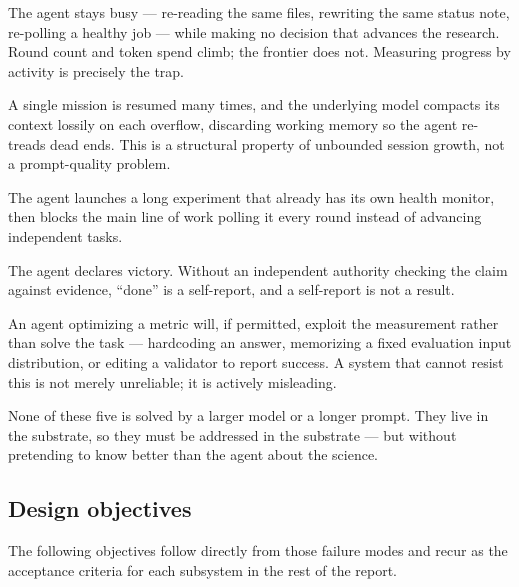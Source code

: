\begin{description}[leftmargin=1.4em, style=nextline]
  \item[High activity, low decision.] The agent stays busy --- re-reading the
    same files, rewriting the same status note, re-polling a healthy job --- while
    making no decision that advances the research. Round count and token spend
    climb; the frontier does not. Measuring progress by activity is precisely the
    trap.
  \item[Context degradation.] A single mission is resumed many times, and the
    underlying model compacts its context lossily on each overflow, discarding
    working memory so the agent re-treads dead ends. This is a structural
    property of unbounded session growth, not a prompt-quality problem.
  \item[Background-job babysitting.] The agent launches a long experiment that
    already has its own health monitor, then blocks the main line of work polling
    it every round instead of advancing independent tasks.
  \item[Premature acceptance.] The agent declares victory. Without an independent
    authority checking the claim against evidence, ``done'' is a self-report, and
    a self-report is not a result.
  \item[Metric exploitation.] An agent optimizing a metric will, if permitted,
    exploit the measurement rather than solve the task --- hardcoding an answer,
    memorizing a fixed evaluation input distribution, or editing a validator to
    report success. A system that cannot resist this is not merely unreliable; it
    is actively misleading.
\end{description}

None of these five is solved by a larger model or a longer prompt. They live in
the substrate, so they must be addressed in the substrate --- but without
pretending to know better than the agent about the science.

\subsection{Design objectives}

The following objectives follow directly from those failure modes and recur as
the acceptance criteria for each subsystem in the rest of the report.

